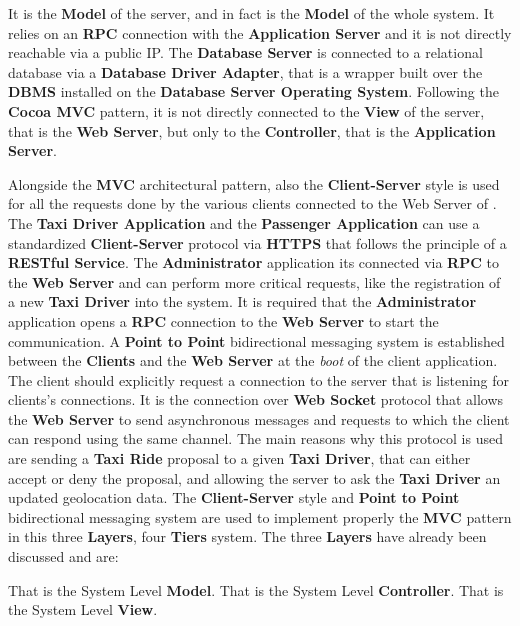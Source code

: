 \begin{itemize}
\begin{itemize}
		 It is the \textbf{Model} of the server, and in fact is the \textbf{Model} of the whole \myTaxiService{} system. It relies on an \textbf{RPC} connection with the \textbf{Application Server} and it is not directly reachable via a public IP. The \textbf{Database Server} is connected to a relational database via a \textbf{Database Driver Adapter}, that is a wrapper built over the \textbf{DBMS} installed on the \textbf{Database Server Operating System}. Following the \textbf{Cocoa MVC} pattern, it is not directly connected to the \textbf{View} of the server, that is the \textbf{Web Server}, but only to the \textbf{Controller}, that is the \textbf{Application Server}.
	\end{itemize}
\end{itemize}
Alongside the \textbf{MVC} architectural pattern, also the \textbf{Client-Server} style is used for all the requests done by the various clients connected to the Web Server of \myTaxiService{}. The \textbf{Taxi Driver Application} and the \textbf{Passenger Application} can use a standardized \textbf{Client-Server} protocol via \textbf{HTTPS} that follows the principle of a \textbf{RESTful Service}. The \textbf{Administrator} application its connected via \textbf{RPC} to the \textbf{Web Server} and can perform more critical requests, like the registration of a new \textbf{Taxi Driver} into the system. It is required that the \textbf{Administrator} application opens a \textbf{RPC} connection to the \textbf{Web Server} to start the communication.
A \textbf{Point to Point} bidirectional messaging system is established between the \textbf{Clients} and the \textbf{Web Server} at the \textit{boot} of the client application. The client should explicitly request a connection to the server that is listening for clients's connections. It is the connection over \textbf{Web Socket} protocol that allows the \textbf{Web Server} to send asynchronous messages and requests to which the client can respond using the same channel. The main reasons why this protocol is used are sending a \textbf{Taxi Ride} proposal to a given \textbf{Taxi Driver}, that can either accept or deny the proposal, and allowing the server to ask the \textbf{Taxi Driver} an updated geolocation data.
The \textbf{Client-Server} style and \textbf{Point to Point} bidirectional messaging system are used to implement properly the \textbf{MVC} pattern in this three \textbf{Layers}, four \textbf{Tiers} system.
The three \textbf{Layers} have already been discussed and are:
\begin{itemize}
	 That is the System Level \textbf{Model}.
	 That is the System Level \textbf{Controller}.
	 That is the System Level \textbf{View}.
\end{itemize}
